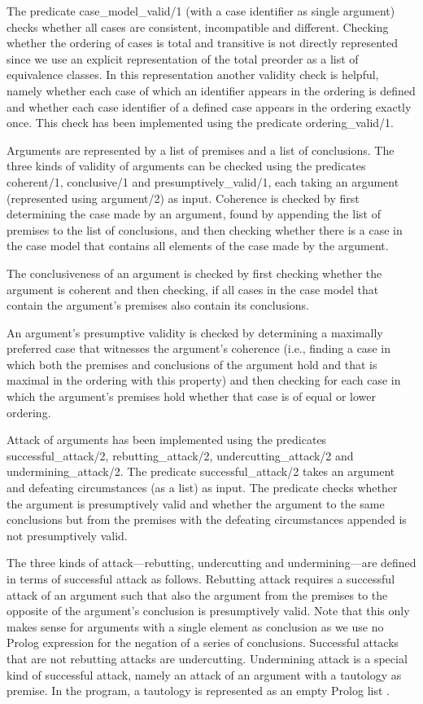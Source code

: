 \documentclass{IOS-Book-Article}
\begin{document}
The predicate {\mf case\_model\_valid/1} (with a case identifier as single argument) checks whether all cases are consistent, incompatible and different. Checking whether the ordering of cases is total and transitive is not directly represented since we use an explicit representation of the total preorder as a list of equivalence classes. In this representation another validity check is helpful, namely whether each case of which an identifier appears in the ordering is defined and whether each case identifier of a defined case appears in the ordering exactly once. This check has been implemented using the predicate {\mf ordering\_valid/1}.

Arguments are represented by a list of premises and a list of conclusions. The three kinds of validity of arguments can be checked using the predicates {\mf coherent/1}, {\mf conclusive/1} and {\mf presumptively\_valid/1}, each taking an argument (represented using {\mf argument/2}) as input. Coherence is checked by first determining the case made by an argument, found by appending the list of premises to the list of conclusions, and then checking whether there is a case in the case model that contains all elements of the case made by the argument. 

The conclusiveness of an argument is checked by first checking whether the argument is coherent and then checking, if all cases in the case model that contain the argument's premises also contain its conclusions. 

An argument's presumptive validity is checked by determining a maximally preferred case that witnesses the argument's coherence (i.e., finding a case in which both the premises and conclusions of the argument hold and that is maximal in the ordering with this property) and then checking for each case in which the argument's premises hold whether that case is of equal or lower ordering. 

Attack of arguments has been implemented using the predicates {\mf successful\_attack/2}, {\mf rebutting\_attack/2}, {\mf undercutting\_attack/2} and {\mf undermining\_attack/2}. The predicate {\mf successful\_attack/2} takes an argument and defeating circumstances (as a list) as input. The predicate checks whether the argument is presumptively valid and whether the argument to the same conclusions but from the premises with the defeating circumstances appended is not presumptively valid. 

The three kinds of attack---rebutting, undercutting and undermining---are defined in terms of successful attack as follows. Rebutting attack requires a successful attack of an argument such that also the argument from the premises to the opposite of the argument's conclusion is presumptively valid. Note that this only makes sense for arguments with a single element as conclusion as we use no Prolog expression for the negation of a series of conclusions. Successful attacks that are not rebutting attacks are undercutting. Undermining attack is a special kind of successful attack, namely an attack of an argument with a tautology as premise. In the program, a tautology is represented as an empty Prolog list {\mf [ ]}.
\end{document}
